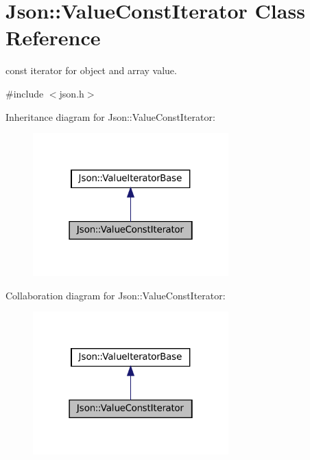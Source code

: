 \hypertarget{classJson_1_1ValueConstIterator}{}\section{Json\+:\+:Value\+Const\+Iterator Class Reference}
\label{classJson_1_1ValueConstIterator}


const iterator for object and array value.  




{\ttfamily \#include $<$json.\+h$>$}



Inheritance diagram for Json\+:\+:Value\+Const\+Iterator\+:
\nopagebreak
\begin{figure}[H]
\begin{center}
\leavevmode
\includegraphics[width=214pt]{classJson_1_1ValueConstIterator__inherit__graph}
\end{center}
\end{figure}


Collaboration diagram for Json\+:\+:Value\+Const\+Iterator\+:
\nopagebreak
\begin{figure}[H]
\begin{center}
\leavevmode
\includegraphics[width=214pt]{classJson_1_1ValueConstIterator__coll__graph}
\end{center}
\end{figure}
